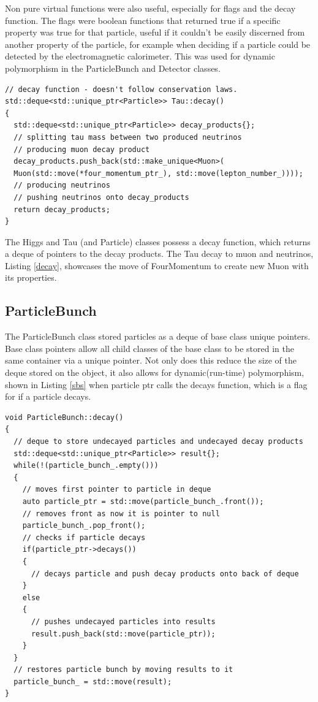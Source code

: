 \documentclass[11pt]{article} %
\begin{document}
Non pure virtual functions were also useful, especially for flags and the decay function. The flags were boolean functions that returned true if a specific property was true for that particle, useful if it couldn't be easily discerned from another property of the particle, for example when deciding if a particle could be detected by the electromagnetic calorimeter. This was used for dynamic polymorphism in the ParticleBunch and Detector classes. 
\begin{lstlisting}[firstnumber=16, caption={Code snippet from Tau.cpp decay member function. Neutrino instantiation and energy/momentum calculation omitted for clarity}, label=decay]
// decay function - doesn't follow conservation laws.
std::deque<std::unique_ptr<Particle>> Tau::decay()
{
  std::deque<std::unique_ptr<Particle>> decay_products{};
  // splitting tau mass between two produced neutrinos
  // producing muon decay product
  decay_products.push_back(std::make_unique<Muon>(
  Muon(std::move(*four_momentum_ptr_), std::move(lepton_number_))));
  // producing neutrinos
  // pushing neutrinos onto decay_products
  return decay_products;
}
\end{lstlisting} 
The Higgs and Tau (and Particle) classes possess a decay function, which returns a deque of pointers to the decay products. The Tau decay to muon and neutrinos, Listing \ref{decay}, showcases the move of FourMomentum to create new Muon with its properties.
\subsection{ParticleBunch}
The ParticleBunch class stored particles as a deque of base class unique pointers. Base class pointers allow all child classes of the base class to be stored in the same container via a unique pointer. Not only does this reduce the size of the deque stored on the object, it also allows for dynamic(run-time) polymorphism, shown in Listing \ref{sbs} when particle ptr calls the decays function, which is a flag for if a particle decays. 

\begin{lstlisting}[firstnumber=108, caption={Code snippet from ParticleBunch.cpp showing the use of polymorphism in deciding which particles to decay and their results.}, label=sbs]
void ParticleBunch::decay()
{
  // deque to store undecayed particles and undecayed decay products
  std::deque<std::unique_ptr<Particle>> result{};
  while(!(particle_bunch_.empty()))
  {
    // moves first pointer to particle in deque
    auto particle_ptr = std::move(particle_bunch_.front());
    // removes front as now it is pointer to null
    particle_bunch_.pop_front();
    // checks if particle decays
    if(particle_ptr->decays())
    {
      // decays particle and push decay products onto back of deque
    }
    else 
    {
      // pushes undecayed particles into results
      result.push_back(std::move(particle_ptr));
    }
  }
  // restores particle bunch by moving results to it
  particle_bunch_ = std::move(result);
}
\end{lstlisting}
\end{document}
